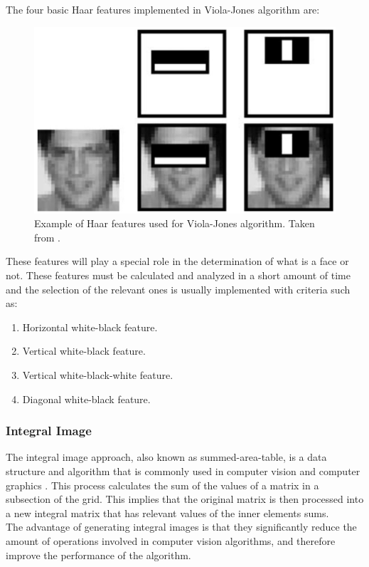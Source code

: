 \documentclass[11pt]{report} %
\begin{document}
The four basic Haar features implemented in Viola-Jones algorithm are:

\begin{figure}[H]
    \centering
    \includegraphics[width=0.6\linewidth]{assets/imgs/computer_vision/viola_jones_haar_features.png}
    \caption{Example of Haar features used for Viola-Jones algorithm. Taken from \citep{cite_haar_features_example_viola_jones}.} 
    \label{fig_viola_jones_features_example}
\end{figure}

These features will play a special role in the determination of what is a face or not. These features must be calculated and analyzed in a short amount of time and the selection of the relevant ones is usually implemented with criteria such as:

\begin{enumerate}
    \item Horizontal white-black feature.
    \item Vertical white-black feature.
    \item Vertical white-black-white feature.
    \item Diagonal white-black feature.
\end{enumerate}

\subsubsection{Integral Image}

The integral image approach, also known as summed-area-table, is a data structure and algorithm that is commonly used in computer vision and computer graphics \citep{cite_matlab_integral_image}. This process calculates the sum of the values of a matrix in a subsection of the grid. This implies that the original matrix is then processed into a new integral matrix that has relevant values of the inner elements sums.\\

The advantage of generating integral images is that they significantly reduce the amount of operations involved in computer vision algorithms, and therefore improve the performance of the algorithm.\\
\end{document}
